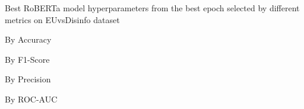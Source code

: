 \begin{table}[!htbp]
    \caption{Best RoBERTa model hyperparameters from the best epoch selected by different metrics on EUvsDisinfo dataset}
    \label{tab:euvsdisinfo_roberta_hparams}
    \centering

    \begin{subtable}[t]{0.48\linewidth}
        \scriptsize
        \caption{By Accuracy}
        
    \end{subtable}
    \hfill
    \begin{subtable}[t]{0.48\linewidth}
        \scriptsize
        \caption{By F1-Score}
        
    \end{subtable}

    \vspace{1em}

    \begin{subtable}[t]{0.48\linewidth}
        \scriptsize
        \caption{By Precision}
        
    \end{subtable}
    \hfill
    \begin{subtable}[t]{0.48\linewidth}
        \scriptsize
        \caption{By ROC-AUC}
        
    \end{subtable}


\end{table}